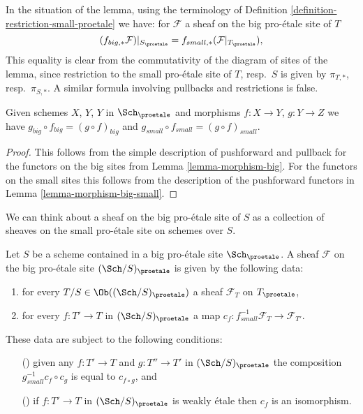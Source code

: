 \noindent
In the situation of the lemma, using the terminology of
Definition \ref{definition-restriction-small-proetale}
we have: for $\mathcal{F}$ a sheaf on the big pro-\'etale site of $T$
$$
(f_{big, *}\mathcal{F})|_{S_\proetale} =
f_{small, *}(\mathcal{F}|_{T_\proetale}),
$$
This equality is clear from the commutativity of the diagram of
sites of the lemma, since restriction to the small pro-\'etale site of
$T$, resp.\ $S$ is given by $\pi_{T, *}$, resp.\ $\pi_{S, *}$. A similar
formula involving pullbacks and restrictions is false.

\begin{lemma}
\label{lemma-composition-proetale}
Given schemes $X$, $Y$, $Y$ in $\Sch_\proetale$
and morphisms $f : X \to Y$, $g : Y \to Z$ we have
$g_{big} \circ f_{big} = (g \circ f)_{big}$ and
$g_{small} \circ f_{small} = (g \circ f)_{small}$.
\end{lemma}

\begin{proof}
This follows from the simple description of pushforward
and pullback for the functors on the big sites from
Lemma \ref{lemma-morphism-big}. For the functors
on the small sites this follows from the description of
the pushforward functors in Lemma \ref{lemma-morphism-big-small}.
\end{proof}

\noindent
We can think about a sheaf on the big pro-\'etale site of $S$ as a collection
of sheaves on the small pro-\'etale site on schemes over $S$.

\begin{lemma}
\label{lemma-characterize-sheaf-big}
Let $S$ be a scheme contained in a big pro-\'etale site $\Sch_\proetale$.
A sheaf $\mathcal{F}$ on the big pro-\'etale site $(\Sch/S)_\proetale$
is given by the following data:
\begin{enumerate}
\item for every $T/S \in \Ob((\Sch/S)_\proetale)$ a sheaf
$\mathcal{F}_T$ on $T_\proetale$,
\item for every $f : T' \to T$ in
$(\Sch/S)_\proetale$ a map
$c_f : f_{small}^{-1}\mathcal{F}_T \to \mathcal{F}_{T'}$.
\end{enumerate}
These data are subject to the following conditions:
\begin{enumerate}
\item[(\romannumeral1)] given any $f : T' \to T$ and $g : T'' \to T'$ in
$(\Sch/S)_\proetale$ the composition
$g_{small}^{-1}c_f \circ c_g$ is equal to $c_{f \circ g}$, and
\item[(\romannumeral2)] if $f : T' \to T$ in $(\Sch/S)_\proetale$
is weakly \'etale then $c_f$ is an isomorphism.
\end{enumerate}
\end{lemma}


